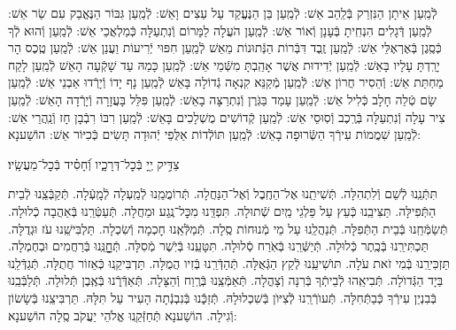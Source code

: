 \documentclass[twoside, openany, parskip=half, 11pt]{book}
\begin{document}
לְֿמַֽעַן אֵיתָן הַנִּזְרַק בְּֿלַֽהַב אֵשׁ: לְֿמַֽעַן בֵּן הַנֶּעֱקַד עַל עֵצִים וָאֵשׁ: לְֿמַֽעַן גִּבּוֹר הַנֶּאֱבַק עִם שַׂר אֵשׁ: לְֿמַֽעַן דְּֿגָלִים הִנְחִֽיתָ בְּֿעָנָן וְֿאוֹר אֵשׁ: לְֿמַֽעַן הֹעֲלָה לַמָּרוֹם וְֿנִתְעַלָּה כְּֿמַלְאֲכֵי אֵשׁ: לְֿמַֽעַן וְֿהוּא לְֿךָ כְּֿסֶֽגֶן בְּֿאֶרְאֶלֵּי אֵשׁ: לְֿמַֽעַן זֶֽבֶד דִּבְּֿרוֹת הַנְּֿתוּנוֹת מֵאֵשׁ לְֿמַֽעַן חִפּוּי יְֿרִיעוֹת וַעֲנַן אֵשׁ: לְֿמַֽעַן טֶֽכֶס הָר יָרַֽדְתָּ עָלָיו בָּאֵשׁ: לְֿמַֽעַן יְֿדִידוּת אֲשֶׁר אָהַֽבְתָּ מִשְּֿׁמֵי אֵשׁ: לְֿמַֽעַן כָּמַהּ עַד שָׁקְֿעָה הָאֵשׁ לְֿמַֽעַן לָקַח מַחְתַּת אֵשׁ: וְֿהֵסִיר חֲרוֹן אֵשׁ: לְֿמַֽעַן מְֿקַנֵּא קִנְאָה גְֿדוֹלָה בָּאֵשׁ לְֿמַֽעַן נָף יָדוֹ וְֿיָרְֿדוּ אַבְנֵי אֵשׁ: לְֿמַֽעַן שָׂם טְֿלֵה חָלָב כְּֿלִיל אֵשׁ: לְֿמַֽעַן עָמַד בַּגֹּֽרֶן וְֿנִתְרַצָּה בָאֵשׁ: לְֿמַֽעַן פִּלֵּל בָּעֲזָרָה וְֿיָרְֿדָה הָאֵשׁ: לְֿמַֽעַן צִיר עָלָה וְֿנִתְעַלָּה בְּֿרֶֽכֶב וְֿסֽוּסֵי אֵשׁ: לְֿמַֽעַן קְֿדוֹשִׁים מֻשְׁלָכִים בָּאֵשׁ: לְֿמַֽעַן רִבּוֹ רִבְֿבָן חָז וְֿנַֽהֲרֵי אֵשׁ:
לְֿמַֽעַן שִׁמֲמוֹת עִירְֿךָ הַשְּֿׂרוּפָה בָאֵשׁ:
לְֿמַֽעַן תּוֹלְֿדוֹת אַלֻּפֵי יְֿהוּדָה תָּשִׂים כְּֿכִיּוֹר אֵשׁ: הוֹשַׁענָא:

צַדִּ֣יק יְ֖יָ בְּֿכׇל־דְּרָכָ֑יו וְֿ֝חָסִ֗יד בְּֿכׇל־מַעֲשָֽׂיו׃

תִּתְּֿנֵֽנוּ לְֿשֵׁם וְֿלִתְהִלָּה.
תְּֿשִׁיתֵֽנוּ אֶל־הַחֶֽבֶל וְֿאֶל־הַנַּחֲלָה.
תְּֿרוֹמֲמֵֽנוּ לְֿמַֽעְלָה לְֿמָֽעְֿלָה.
תְּֿקַבְּֿצֵֽנוּ לְֿבֵית הַתְּֿפִילָּה.
תַּצִּיבֵֽנוּ כְּֿעֵץ עַל פַּלְגֵי מַֽיִם שְֿׁתוּלָה.
תִּפְדֵּֽנוּ מִכׇּל־נֶֽגַע וּמַחֲלָה.
תְּֿעַטְּֿרֵֽנוּ בְּֿאַהֲבָה כְֿלוּלָה.
תְּֿשַׂמְּֿחֵֽנוּ בְּֿבֵית הַתְּֿפִלָּה.
תְּֿנַהֲלֵֽנוּ עַל מֵי מְֿנוּחוֹת סֶֽלָה.
תְּֿמַלְּֿאֵֽנוּ חׇכְמָה וְֿשִׂכְלָה.
תַּלְבִּישֵֽׁנוּ עֹז וּגְדֻלָּה.
תַּכְתִּירֵֽנוּ בְּֿכֶֽתֶר כְּֿלוּלָה.
תְּֿיַשְּֿׁרֵֽנוּ בְּֿאֹֽרַח סְֿלוּלָה.
תִּטָּעֵֽנוּ בְּֿיֹֽשֶׁר מְֿסִלָּה.
תְּֿחׇׇׇׇָנֵּֽנוּ בְּֿרַחֲמִים וּבְחֶמְלָה.
תַּזְכִּירֵֽנוּ בְּֿמִי זֹאת עֹלָה.
תּוׂשִׁיעֵֽנוּ לְֿקֵץ הַגְּֿאֻלָּה.
תְּֿהַדְּֿרֵֽנוּ בְּֿזִיו הֲמֻלָּה.
תַּדְבִּיקֵֽנוּ כְּֿאֵזוֹר חֲתֻלָּה.
תְּֿגַדְּֿלֵֽנוּ בַּיָד הַגְּֿדוׂלָה.
תְּֿבִיאֵֽהוּ לְֿבֵיתְֿךָ בְּֿרִנָּה וְֿצָהֳלָה.
תְּֿאַמְּֿצֵֽנוּ בְּֿרֶֽוַח וְֿהַצָּלָה.
תְּֿאַדְּֿרְֵֿנוּ בְּֿאֶֽבֶן תְּֿלוּלָה.
תְּֿלַבְּֿבֵֽנוּ בְּֿבִנְיַן עִירְֿךָ כְּֿבַתְּֿחִלָּה.
תְּֿעוׂרְֿרֵֽנוּ לְֿצִיּוׂן בְּֿשִׁכְלוּלָהּ.
תְּֿזַכְֵּֿֿנוּ בְּֿנִבְנְֿתָה הָעִיר עַל תִּלָּהּ.
תַּרְבִּיצֵֽנוּ בְּֿשָׂשׂוֹן וְֿגִילָה.
הוֹשַׁענָא תְּֿחַזְּֿקֵֽנוּ אֱלֹהֵי יַעֲקֹב סֶֽלָה הוֹשַׁענָא:
\end{document}
